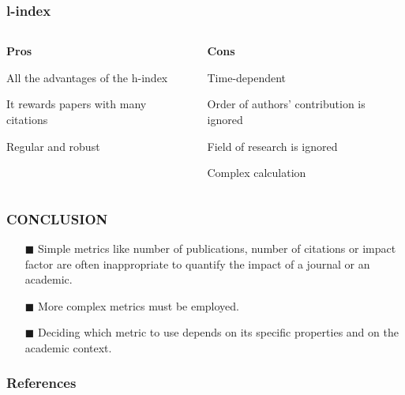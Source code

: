 \documentclass{beamer}
\begin{document}
\begin{frame}
    \frametitle{l-index}
    \begin{columns}[T]
        \begin{column}{.5\textwidth}
            \centering \textbf{Pros}
            \begin{propslist}
                \item All the advantages of the h-index
                \item It rewards papers with many citations
                \item Regular and robust
            \end{propslist}
        \end{column}
        \begin{column}{.5\textwidth}
            \centering \textbf{Cons} %
            \begin{conslist}
                \item Time-dependent
                \item Order of authors' contribution is ignored
                \item Field of research is ignored
                \item Complex calculation
            \end{conslist}
        \end{column}
    \end{columns}
\end{frame}
\begin{frame}
\frametitle{CONCLUSION}
\begin{itemize}
\item [$\blacksquare$] Simple metrics like number of publications, number of citations or impact factor are often inappropriate to quantify the impact of a journal or an academic.
\item [$\blacksquare$] More complex metrics must be employed.
\item [$\blacksquare$] Deciding which metric to use depends on its specific properties and on the academic context.
\end{itemize}
\end{frame}

\begin{frame}[allowframebreaks]
    \frametitle{References}

    
    

\end{frame}
\end{document}
